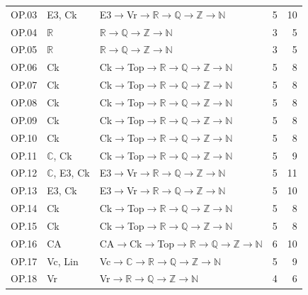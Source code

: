 {\begin{longtable}{l p{4.6cm} p{7.4cm} r r}
OP.03 & \textsf{E3}, \textsf{Ck} & \textsf{E3}$\to$\textsf{Vr}$\to$$\mathbb R$$\to$$\mathbb Q$$\to$$\mathbb Z$$\to$$\mathbb N$ & 5 & 10 \\
OP.04 & $\mathbb R$ & $\mathbb R$$\to$$\mathbb Q$$\to$$\mathbb Z$$\to$$\mathbb N$ & 3 & 5 \\
OP.05 & $\mathbb R$ & $\mathbb R$$\to$$\mathbb Q$$\to$$\mathbb Z$$\to$$\mathbb N$ & 3 & 5 \\
OP.06 & \textsf{Ck} & \textsf{Ck}$\to$\textsf{Top}$\to$$\mathbb R$$\to$$\mathbb Q$$\to$$\mathbb Z$$\to$$\mathbb N$ & 5 & 8 \\
OP.07 & \textsf{Ck} & \textsf{Ck}$\to$\textsf{Top}$\to$$\mathbb R$$\to$$\mathbb Q$$\to$$\mathbb Z$$\to$$\mathbb N$ & 5 & 8 \\
OP.08 & \textsf{Ck} & \textsf{Ck}$\to$\textsf{Top}$\to$$\mathbb R$$\to$$\mathbb Q$$\to$$\mathbb Z$$\to$$\mathbb N$ & 5 & 8 \\
OP.09 & \textsf{Ck} & \textsf{Ck}$\to$\textsf{Top}$\to$$\mathbb R$$\to$$\mathbb Q$$\to$$\mathbb Z$$\to$$\mathbb N$ & 5 & 8 \\
OP.10 & \textsf{Ck} & \textsf{Ck}$\to$\textsf{Top}$\to$$\mathbb R$$\to$$\mathbb Q$$\to$$\mathbb Z$$\to$$\mathbb N$ & 5 & 8 \\
OP.11 & $\mathbb C$, \textsf{Ck} & \textsf{Ck}$\to$\textsf{Top}$\to$$\mathbb R$$\to$$\mathbb Q$$\to$$\mathbb Z$$\to$$\mathbb N$ & 5 & 9 \\
OP.12 & $\mathbb C$, \textsf{E3}, \textsf{Ck} & \textsf{E3}$\to$\textsf{Vr}$\to$$\mathbb R$$\to$$\mathbb Q$$\to$$\mathbb Z$$\to$$\mathbb N$ & 5 & 11 \\
OP.13 & \textsf{E3}, \textsf{Ck} & \textsf{E3}$\to$\textsf{Vr}$\to$$\mathbb R$$\to$$\mathbb Q$$\to$$\mathbb Z$$\to$$\mathbb N$ & 5 & 10 \\
OP.14 & \textsf{Ck} & \textsf{Ck}$\to$\textsf{Top}$\to$$\mathbb R$$\to$$\mathbb Q$$\to$$\mathbb Z$$\to$$\mathbb N$ & 5 & 8 \\
OP.15 & \textsf{Ck} & \textsf{Ck}$\to$\textsf{Top}$\to$$\mathbb R$$\to$$\mathbb Q$$\to$$\mathbb Z$$\to$$\mathbb N$ & 5 & 8 \\
OP.16 & \textsf{CA} & \textsf{CA}$\to$\textsf{Ck}$\to$\textsf{Top}$\to$$\mathbb R$$\to$$\mathbb Q$$\to$$\mathbb Z$$\to$$\mathbb N$ & 6 & 10 \\
OP.17 & \textsf{Vc}, \textsf{Lin} & \textsf{Vc}$\to$$\mathbb C$$\to$$\mathbb R$$\to$$\mathbb Q$$\to$$\mathbb Z$$\to$$\mathbb N$ & 5 & 9 \\
OP.18 & \textsf{Vr} & \textsf{Vr}$\to$$\mathbb R$$\to$$\mathbb Q$$\to$$\mathbb Z$$\to$$\mathbb N$ & 4 & 6 \\

\end{longtable}}
